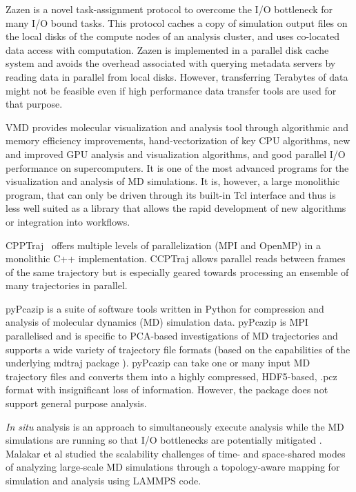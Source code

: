 Zazen \cite{Zazen} is a novel task-assignment protocol to overcome the I/O bottleneck for many I/O bound tasks. This protocol caches a copy of simulation output files on the local disks of the compute nodes of an analysis cluster, and uses co-located data access with computation. 
Zazen is implemented in a parallel disk cache system and avoids the overhead associated with querying metadata servers by reading data in parallel from local disks.
However, transferring Terabytes of data might not be feasible even if high performance data transfer tools are used for that purpose.

VMD \cite{Hum96, VMD2013} provides molecular visualization and analysis tool through algorithmic and memory efficiency improvements, hand-vectorization of key CPU algorithms, new and improved GPU analysis and visualization algorithms, and good parallel I/O performance on supercomputers. It is one of the most advanced programs for the visualization and analysis of MD simulations. It is, however, a large monolithic program, that can only be driven through its built-in Tcl interface and thus is less well suited as a library that allows the rapid development of new algorithms or integration into workflows.

CPPTraj~\cite{cpptraj-2013} offers multiple levels of parallelization (MPI and OpenMP) in a monolithic C++ implementation.
CCPTraj allows parallel reads between frames of the same trajectory but is especially geared towards processing an ensemble of many trajectories in parallel.

pyPcazip \cite{pyPcazip} is a suite of software tools written in Python for compression and analysis of molecular dynamics (MD) simulation data. 
pyPcazip is MPI parallelised and is specific to PCA-based investigations of MD trajectories and supports a wide variety of trajectory file formats (based on the capabilities of the underlying mdtraj package \cite{mdtraj-2015}).
pyPcazip can take one or many input MD trajectory files and converts them into a highly compressed, HDF5-based, .pcz format with insignificant loss of information.
However, the package does not support general purpose analysis.

\textit{In situ} analysis is an approach to simultaneously execute analysis while the MD simulations are running so that I/O bottlenecks are potentially mitigated \cite{Malakar-etal}.
Malakar et al studied the scalability challenges of time- and space-shared modes of analyzing large-scale MD simulations through a topology-aware mapping for simulation and analysis using LAMMPS code.

